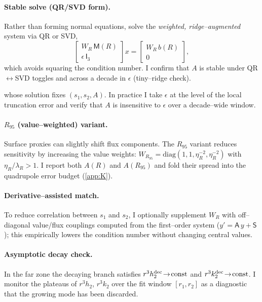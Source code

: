\documentclass{iopjournal}
\begin{document}
\paragraph{Stable solve (QR/SVD form).}
Rather than forming normal equations, solve the \emph{weighted, ridge–augmented} system via QR or SVD,
\begin{equation}
\begin{bmatrix} W_R\,\mathsf M(R) \\[2pt] \epsilon\,\mathsf I_3 \end{bmatrix} x
=\begin{bmatrix} W_R\,b(R) \\[2pt] 0 \end{bmatrix},
\label{eq:I3_augmented_qr}
\end{equation}
which avoids squaring the condition number. I confirm that $A$ is stable under QR$\leftrightarrow$SVD toggles and across a decade in $\epsilon$ (tiny–ridge check).

whose solution fixes $(s_1,s_2,A)$. In practice I take $\epsilon$ at the level of the local truncation error and verify that $A$ is insensitive to $\epsilon$ over a decade–wide window.

\paragraph{$R_{95}$ (value–weighted) variant.}
Surface proxies can slightly shift flux components. The $R_{95}$ variant reduces sensitivity by increasing the value weights: $W_{R_{95}}=\mathrm{diag}(1,1,\eta_R^{-2},\eta_R^{-2})$ with $\eta_R/\lambda_R>1$. I report both $A(R)$ and $A(R_{95})$ and fold their spread into the quadrupole error budget (\cref{app:K}).

\paragraph{Derivative–assisted match.}
To reduce correlation between $s_1$ and $s_2$, I optionally supplement $W_R$ with off–diagonal value/flux couplings computed from the first–order system ($y'=\mathsf A\,y+\mathsf S$); this empirically lowers the condition number without changing central values.
\paragraph{Asymptotic decay check.}
In the far zone the decaying branch satisfies $r^{3}h_2^{\rm dec}\!\to\!\mathrm{const}$ and $r^{3}k_2^{\rm dec}\!\to\!\mathrm{const}$. I monitor the plateaus of
$r^{3}h_2$, $r^{3}k_2$ over the fit window $[r_1,r_2]$ as a diagnostic that the growing mode has been discarded.
\end{document}
